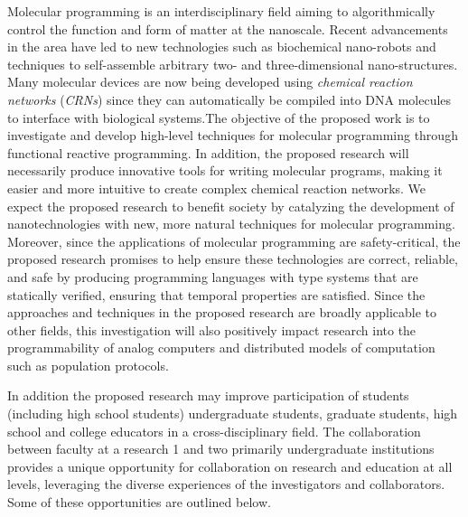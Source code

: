 

Molecular programming is an interdisciplinary field aiming to algorithmically control the function and form of matter at the nanoscale.
Recent advancements in the area have led to new technologies such as biochemical nano-robots and techniques to self-assemble arbitrary two- and three-dimensional nano-structures.
Many molecular devices are now being developed using \emph{chemical reaction networks} (\emph{CRNs}) since they can automatically be compiled into DNA molecules to interface with biological systems.The objective of the proposed work is to investigate and develop high-level techniques for molecular programming through functional reactive programming.
In addition, the proposed research will necessarily produce innovative tools for writing molecular programs, making it easier and more intuitive to create complex chemical reaction networks.
We expect the proposed research to benefit society by catalyzing the development of nanotechnologies with new, more natural techniques for molecular programming.
Moreover, since the applications of molecular programming are safety-critical, the proposed research promises to help ensure these technologies are correct, reliable, and safe by producing programming languages with type systems that are statically verified, ensuring that temporal properties are satisfied.
Since the approaches and techniques in the proposed research are broadly applicable to other fields, this investigation will also positively impact research into the programmability of analog computers and distributed models of computation such as population protocols.

In addition the proposed research may improve participation of students (including high school students) undergraduate students, graduate students, high school and college educators in a cross-disciplinary field.
The collaboration between faculty at a research 1 and two primarily undergraduate institutions provides a unique opportunity for collaboration on research and education at all levels, leveraging the diverse experiences of the investigators and collaborators.
Some of these opportunities are outlined below.  
